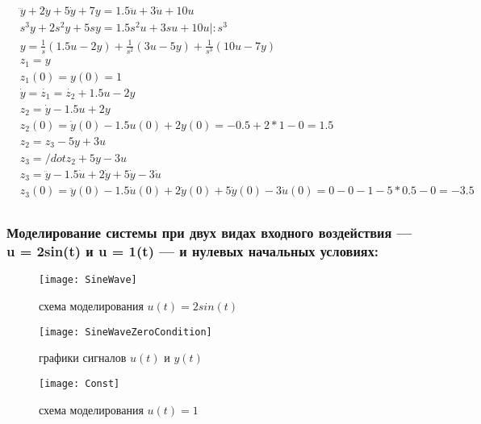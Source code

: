 \begin{equation}
	\begin{split}	
&\dddot{y} + 2\ddot{y} + 5\dot{y} + 7y = 1.5\ddot{u} + 3\dot{u} + 10u\\
&s^3y + 2s^2y + 5sy = 1.5s^2u + 3su + 10u | :s^3\\
&y = \frac{1}{s}(1.5u - 2y) + \frac{1}{s^2}(3u - 5y) + \frac{1}{s^3}(10u - 7y)\\
&z_1 = y\\
&z_1(0) = y(0) = 1\\
&\dot{y} = \dot{z_1} = \dot{z_2} + 1.5u - 2y\\
&z_2 = \dot{y} - 1.5u + 2y\\
&z_2(0) = \dot{y}(0) - 1.5u(0) + 2y(0) = -0.5 + 2*1 - 0 = 1.5\\
&z_2 = z_3 - 5y + 3u\\
&z_3 = /dot{z_2} + 5y -3u\\
&z_3 = \ddot{y} - 1.5\dot{u} + 2\dot{y} + 5\dot{y} -3\dot{u}\\
&z_3(0) = \ddot{y}(0) - 1.5\dot{u}(0) + 2\dot{y}(0) + 5\dot{y}(0) - 3\dot{u}(0) = 0 -0 - 1 - 5*0.5 - 0 = -3.5\\
	\end{split}
\end{equation}

\subsubsection{Моделирование системы при двух видах входного воздействия — u = 2sin(t)  и u = 1(t) — и нулевых начальных условиях:}

\begin{figure}[H]
	\begin{center}
		\texttt{[image: SineWave]}
		\caption{схема моделирования $u(t) = 2sin(t)$} 
		\label{pic:pic_1} %
	\end{center}
\end{figure}

\begin{figure}[H]
	\begin{center}
		\texttt{[image: SineWaveZeroCondition]}
		\caption{графики сигналов $u(t)$ и $y(t)$} 
		\label{pic:pic_2} %
	\end{center}
\end{figure}

\begin{figure}[H]
	\begin{center}
		\texttt{[image: Const]}
		\caption{схема моделирования $u(t) = 1$} 
		\label{pic:pic_3} %
	\end{center}
\end{figure}

